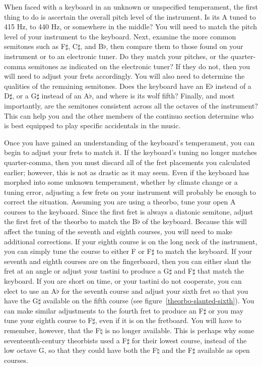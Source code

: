 When faced with a keyboard in an unknown or unspecified temperament, the first thing to do is
ascertain the overall pitch level of the instrument.  Is its A tuned to 415 Hz, to 440 Hz, or
somewhere in the middle?  You will need to match the pitch level of your instrument to the keyboard.
Next, examine the more common semitones such as F$\sharp$, C$\sharp$, and B$\flat$, then compare
them to those found on your instrument or to an electronic tuner.  Do they match your pitches, or
the quarter-comma semitones as indicated on the electronic tuner?  If they do not, then you will
need to adjust your frets accordingly.  You will also need to determine the qualities of the
remaining semitones.  Does the keyboard have an E$\flat$ instead of a D$\sharp$, or a G$\sharp$
instead of an A$\flat$, and where is its wolf fifth?  Finally, and most importantly, are the
semitones consistent across all the octaves of the instrument?  This can help you and the other
members of the continuo section determine who is best equipped to play specific accidentals in the
music.

Once you have gained an understanding of the keyboard's temperament, you can begin to adjust your
frets to match it.  If the keyboard's tuning no longer matches quarter-comma, then you must discard
all of the fret placements you calculated earlier; however, this is not as drastic as it may seem.
Even if the keyboard has morphed into some unknown temperament, whether by climate change or a
tuning error, adjusting a few frets on your instrument will probably be enough to correct the
situation.  Assuming you are using a theorbo, tune your open A courses to the keyboard.  Since the
first fret is always a diatonic semitone, adjust the first fret of the theorbo to match the B$\flat$
of the keyboard.  Because this will affect the tuning of the seventh and eighth courses, you will
need to make additional corrections.  If your eighth course is on the long neck of the instrument,
you can simply tune the course to either F or F$\sharp$ to match the keyboard.  If your seventh and
eighth courses are on the fingerboard, then you can either slant the fret at an angle or adjust your
tastini to produce a G$\sharp$ and F$\sharp$ that match the keyboard.  If you are short
on time, or your tastini do not cooperate, you can elect to use an A$\flat$ for the seventh course
and adjust your sixth fret so that you have the G$\sharp$ available on the fifth course (see
figure~\ref{theorbo-slanted-sixth}).  You can make similar adjustments to the fourth fret to produce
an F$\sharp$ or you may tune your eighth course to F$\sharp$, even if it is on the fretboard.  You
will have to remember, however, that the F$\natural$ is no longer available.  This is perhaps why
some seventeenth-century theorbists used a F$\sharp$ for their lowest course, instead of the low
octave G, so that they could have both the F$\natural$ and the F$\sharp$ available as open courses.


